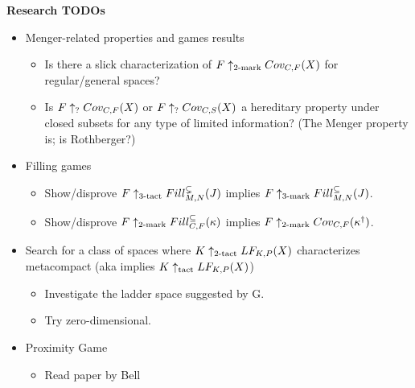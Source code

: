 


\centerline{\bf Research TODOs}

  \begin{itemize}
    \item Menger-related properties and games results
      \begin{itemize}
        \item Is there a slick characterization of $F\uparrow_{2\text{-mark}}Cov_{C,F}(X)$ for regular/general spaces?
        \item Is $F\uparrow_{?}Cov_{C,F}(X)$ or $F\uparrow_{?}Cov_{C,S}(X)$ a hereditary property under closed subsets for any type of limited information? (The Menger property is; is Rothberger?)
      \end{itemize}
    \item Filling games
      \begin{itemize}
        \item Show/disprove $F\uparrow_{3\text{-tact}}Fill^{\subsetneq}_{M,N}(J)$ implies $F\uparrow_{3\text{-mark}}Fill^{\subseteq}_{M,N}(J)$.
        \item Show/disprove $F\uparrow_{2\text{-mark}}Fill^{\subseteq}_{C,F}(\kappa)$ implies $F\uparrow_{2\text{-mark}}Cov_{C,F}(\kappa^\dagger)$.
      \end{itemize}
    \item Search for a class of spaces where $K\uparrow_{2\text{-tact}}LF_{K,P}(X)$ characterizes metacompact (aka implies $K\uparrow_{\text{tact}}LF_{K,P}(X)$)
      \begin{itemize}
        \item Investigate the ladder space suggested by G.
        \item Try zero-dimensional.
      \end{itemize}
    \item Proximity Game
      \begin{itemize}
        \item Read paper by Bell
      \end{itemize}
  \end{itemize}
